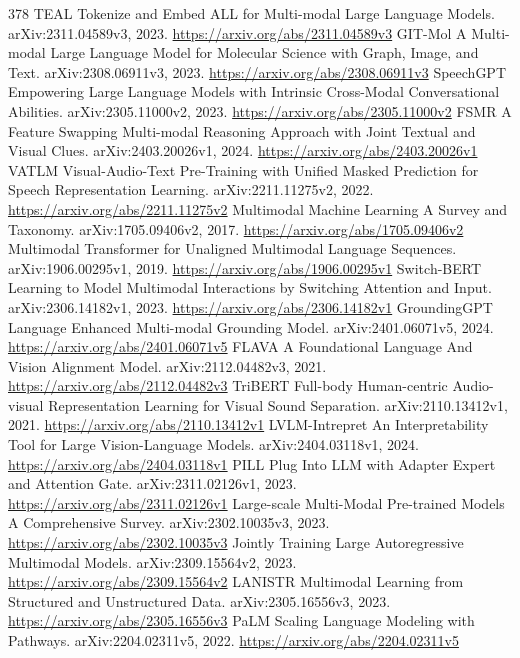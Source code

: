 \documentclass[11pt]{article}
\begin{document}
\begin{thebibliography}{378}
 TEAL Tokenize and Embed ALL for Multi-modal Large Language Models. arXiv:2311.04589v3, 2023. \url{https://arxiv.org/abs/2311.04589v3}
 GIT-Mol A Multi-modal Large Language Model for Molecular Science with Graph, Image, and Text. arXiv:2308.06911v3, 2023. \url{https://arxiv.org/abs/2308.06911v3}
 SpeechGPT Empowering Large Language Models with Intrinsic Cross-Modal Conversational Abilities. arXiv:2305.11000v2, 2023. \url{https://arxiv.org/abs/2305.11000v2}
 FSMR A Feature Swapping Multi-modal Reasoning Approach with Joint Textual and Visual Clues. arXiv:2403.20026v1, 2024. \url{https://arxiv.org/abs/2403.20026v1}
 VATLM Visual-Audio-Text Pre-Training with Unified Masked Prediction for Speech Representation Learning. arXiv:2211.11275v2, 2022. \url{https://arxiv.org/abs/2211.11275v2}
 Multimodal Machine Learning A Survey and Taxonomy. arXiv:1705.09406v2, 2017. \url{https://arxiv.org/abs/1705.09406v2}
 Multimodal Transformer for Unaligned Multimodal Language Sequences. arXiv:1906.00295v1, 2019. \url{https://arxiv.org/abs/1906.00295v1}
 Switch-BERT Learning to Model Multimodal Interactions by Switching Attention and Input. arXiv:2306.14182v1, 2023. \url{https://arxiv.org/abs/2306.14182v1}
 GroundingGPT Language Enhanced Multi-modal Grounding Model. arXiv:2401.06071v5, 2024. \url{https://arxiv.org/abs/2401.06071v5}
 FLAVA A Foundational Language And Vision Alignment Model. arXiv:2112.04482v3, 2021. \url{https://arxiv.org/abs/2112.04482v3}
 TriBERT Full-body Human-centric Audio-visual Representation Learning for Visual Sound Separation. arXiv:2110.13412v1, 2021. \url{https://arxiv.org/abs/2110.13412v1}
 LVLM-Intrepret An Interpretability Tool for Large Vision-Language Models. arXiv:2404.03118v1, 2024. \url{https://arxiv.org/abs/2404.03118v1}
 PILL Plug Into LLM with Adapter Expert and Attention Gate. arXiv:2311.02126v1, 2023. \url{https://arxiv.org/abs/2311.02126v1}
 Large-scale Multi-Modal Pre-trained Models A Comprehensive Survey. arXiv:2302.10035v3, 2023. \url{https://arxiv.org/abs/2302.10035v3}
 Jointly Training Large Autoregressive Multimodal Models. arXiv:2309.15564v2, 2023. \url{https://arxiv.org/abs/2309.15564v2}
 LANISTR Multimodal Learning from Structured and Unstructured Data. arXiv:2305.16556v3, 2023. \url{https://arxiv.org/abs/2305.16556v3}
 PaLM Scaling Language Modeling with Pathways. arXiv:2204.02311v5, 2022. \url{https://arxiv.org/abs/2204.02311v5}

\end{thebibliography}
\end{document}
